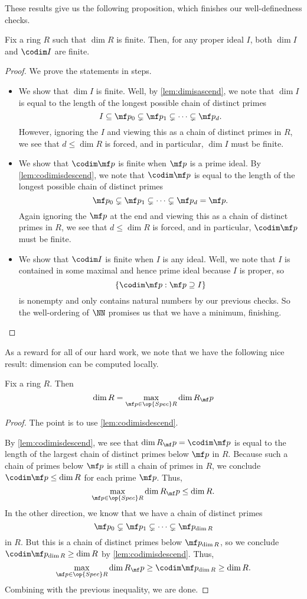These results give us the following proposition, which finishes our well-definedness checks.
\begin{prop}
	Fix a ring $R$ such that $\dim R$ is finite. Then, for any proper ideal $I$, both $\dim I$ and $\codim I$ are finite.
\end{prop}
\begin{proof}
	We prove the statements in steps.
	\begin{itemize}
		\item We show that $\dim I$ is finite. Well, by \autoref{lem:dimisascend}, we note that $\dim I$ is equal to the length of the longest possible chain of distinct primes
		\[I\subseteq\mf p_0\subsetneq\mf p_1\subsetneq\cdots\subsetneq\mf p_d.\]
		However, ignoring the $I$ and viewing this as a chain of distinct primes in $R$, we see that $d\le\dim R$ is forced, and in particular, $\dim I$ must be finite.
		\item We show that $\codim\mf p$ is finite when $\mf p$ is a prime ideal. By \autoref{lem:codimisdescend}, we note that $\codim\mf p$ is equal to the length of the longest possible chain of distinct primes
		\[\mf p_0\subsetneq\mf p_1\subsetneq\cdots\subsetneq\mf p_d=\mf p.\]
		Again ignoring the $\mf p$ at the end and viewing this as a chain of distinct primes in $R$, we see that $d\le\dim R$ is forced, and in particular, $\codim\mf p$ must be finite.
		\item We show that $\codim I$ is finite when $I$ is any ideal. Well, we note that $I$ is contained in some maximal and hence prime ideal because $I$ is proper, so
		\[\{\codim\mf p:\mf p\supseteq I\}\]
		is nonempty and only contains natural numbers by our previous checks. So the well-ordering of $\NN$ promises us that we have a minimum, finishing.
		\qedhere
	\end{itemize}
\end{proof}
As a reward for all of our hard work, we note that we have the following nice result: dimension can be computed locally.
\begin{theorem}
	Fix a ring $R$. Then
	\[\dim R=\max_{\mf p\in\op{Spec}R}\dim R_\mf p\]
\end{theorem}
\begin{proof}
	The point is to use \autoref{lem:codimisdescend}.
	
	By \autoref{lem:codimisdescend}, we see that $\dim R_\mf p=\codim\mf p$ is equal to the length of the largest chain of distinct primes below $\mf p$ in $R$. Because such a chain of primes below $\mf p$ is still a chain of primes in $R$, we conclude $\codim\mf p\le\dim R$ for each prime $\mf p$. Thus,
	\[\max_{\mf p\in\op{Spec}R}\dim R_\mf p\le\dim R.\]
	In the other direction, we know that we have a chain of distinct primes
	\[\mf p_0\subsetneq\mf p_1\subsetneq\cdots\subsetneq\mf p_{\dim R}\]
	in $R$. But this is a chain of distinct primes below $\mf p_{\dim R}$, so we conclude $\codim\mf p_{\dim R}\ge\dim R$ by \autoref{lem:codimisdescend}. Thus,
	\[\max_{\mf p\in\op{Spec}R}\dim R_\mf p\ge\codim\mf p_{\dim R}\ge\dim R.\]
	Combining with the previous inequality, we are done.
\end{proof}


